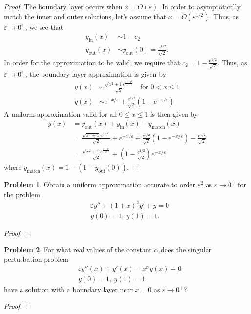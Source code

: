 \documentclass[12pt]{article}
\theoremstyle{definition}
\newtheorem{problem}{Problem}
\begin{document}
\begin{proof}
  The boundary layer occurs when $x=O(\varepsilon)$. In order to asymptotically match the inner and outer solutions,
  let's assume that $x=O(\varepsilon^{1/2})$. Thus, as $\varepsilon \to 0^+$, we see that
  \begin{align*}
    y_{\text{in}}(x) &\sim 1 - c_2 \\
    y_{\text{out}}(x) &\sim y_{\text{out}}(0) = \frac{e^{1/2}}{\sqrt{2}}.
  \end{align*}
  In order for the approximation to be valid, we require that $c_2 = 1 - \frac{e^{1/2}}{\sqrt{2}}$.
  Thus, as $\varepsilon \to 0^+$, the boundary layer approximation is given by
  \begin{align*}
    y(x) &\sim \frac{   \sqrt{x^2+1}e^{\frac{1-x^2}{2}}}{\sqrt{2}} \quad \text{for $0<x\leq 1$} \\
    y(x) &\sim e^{-x/\varepsilon} + \frac{e^{1/2}}{\sqrt{2}}\left(1-e^{-x/\varepsilon}\right)
  \end{align*}
  A uniform approximation valid for all $0\leq x \leq 1$ is then given by
  \begin{align*}
    y(x) &= y_{\text{out}}(x) + y_{\text{in}}(x) - y_{\text{match}}(x) \\
    &= \frac{   \sqrt{x^2+1}e^{\frac{1-x^2}{2}}}{\sqrt{2}} + e^{-x/\varepsilon} + \frac{e^{1/2}}{\sqrt{2}}\left(1-e^{-x/\varepsilon}\right) - \frac{e^{1/2}}{\sqrt{2}}\\
    &= \frac{   \sqrt{x^2+1}e^{\frac{1-x^2}{2}}}{\sqrt{2}} + \left(1 - \frac{e^{1/2}}{\sqrt{2}}\right)e^{-x/\varepsilon},
  \end{align*}
  where $y_{\text{match}}(x) = 1 - (1 -y_{\text{out}}(0))$.
\end{proof}
\newpage


\begin{problem}
  Obtain a uniform approximation accurate to order $\varepsilon ^2$ as $\varepsilon \to 0^+$
  for the problem
  \begin{align*}
      &\varepsilon y'' + (1+x)^2 y' + y = 0 \\
      &y(0) = 1,\ y(1) = 1.
  \end{align*}
\end{problem}

\begin{proof}
\end{proof}
\newpage


\begin{problem}
  For what real values of the constant $\alpha$ does the singular perturbation
  problem
  \begin{align*}
    &\varepsilon y''(x) + y'(x) - x^\alpha y(x) = 0  \\
    &y(0) = 1,\ y(1) = 1.
  \end{align*}
  have a solution with a boundary layer near $x=0$ as $\varepsilon \to 0^+$?
\end{problem}

\begin{proof}
\end{proof}
\newpage
\end{document}
